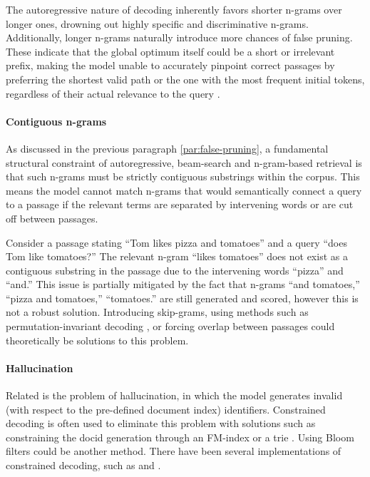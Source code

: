 The autoregressive nature of decoding inherently favors shorter n-grams over longer ones, \cite{peiwen-yuan-generative-dense} drowning out highly specific and discriminative n-grams. Additionally, longer n-grams naturally introduce more chances of false pruning. These indicate that the global optimum itself could be a short or irrelevant prefix, making the model unable to accurately pinpoint correct passages by preferring the shortest valid  path or the one with the most frequent initial tokens, regardless of their actual relevance to the query \cite{hansi-zeng-scalable-and}.

\paragraph{Contiguous n-grams}
As discussed in the previous paragraph \ref{par:false-pruning}, a fundamental structural constraint of autoregressive, beam-search and n-gram-based retrieval is that such n-grams must be strictly contiguous substrings within the corpus. This means the model cannot match n-grams that would semantically connect a query to a passage if the relevant terms are separated by intervening words or are cut off between passages.

Consider a passage stating ``Tom likes pizza and tomatoes'' and a query ``does Tom like tomatoes?'' The relevant n-gram ``likes tomatoes'' does not exist as a contiguous substring in the passage due to the intervening words ``pizza'' and ``and.''  This issue is partially mitigated by the fact that n-grams ``and tomatoes,'' ``pizza and tomatoes,'' ``tomatoes.'' are still generated and scored, however this is not a robust solution. Introducing skip-grams, using methods such as permutation-invariant decoding \cite{peitian-zhang-generative-retrieval}, or forcing overlap between passages could theoretically be solutions to this problem.


\paragraph{Hallucination}
\label{par:hallucination}


Related is the problem of hallucination, in which the model generates invalid (with respect to the pre-defined document index) identifiers. Constrained decoding is often used to eliminate this problem with solutions such as constraining the docid generation through an FM-index \cite{michele-bevilacqua-autoregressive-search} or a trie \cite{nicola-de-cao-autoregressive-entity}. Using Bloom filters \cite{bloom-spacetime-tradeoffs} could be another method. There have been several implementations of constrained decoding, such as  \cite{michele-bevilacqua-autoregressive-search} and  \cite{yongqi-li-multiview-identifiers}.
 
